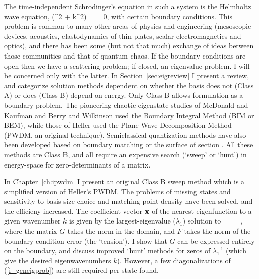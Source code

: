The time-independent Schrodinger's equation in such a system is
the Helmholtz wave equation,
\be
\label{eq:i_helm}
	(\nabla^2 + k^2) \psi\ofr \ = \ 0,
\ee
with certain boundary conditions.
This problem is common to many other areas of physics and engineering
(mesoscopic devices, acoustics, elastodynamics of thin plates,
scalar electromagnetics and optics),
and there
has been some (but not that much) exchange of ideas between those communities
and that of quantum chaos.
If the boundary conditions are open then we have a scattering problem;
if closed, an eigenvalue problem.
I will be concerned only with the latter.
In Section~\ref{sec:eigreview} I present a review, and
categorize solution methods dependent on whether the basis
does not (Class A) or does (Class B) depend on energy.
Only Class B allows formulation as a boundary problem.
The pioneering chaotic eigenstate studies of
McDonald and Kaufman \cite{macdonald}
and Berry and Wilkinson \cite{berrywilk} used the Boundary Integral Method
\cite{bim1,bim2}
(BIM or BEM), while those of Heller
\cite{Heller84,hellerleshouches} used the Plane Wave Decomposition Method (PWDM,
an original technique).
Semiclassical quantization methods have also been developed based
on boundary matching \cite{berrykkr} or the surface of section
\cite{bogomolny}.
All these methods are Class B, and all require an expensive search
(`sweep' or `hunt') in energy-space for zero-determinants of a matrix.

In Chapter~\ref{ch:ipwdm} I present an original
Class B sweep method which is a simplified
version of Heller's PWDM. The problems of missing states and sensitivity to
basis size choice and matching point density have been solved,
and the efficieny increased.
The coefficient vector ${\mathbf x}$ of the nearest eigenfunction to a given
wavenumber $k$ is given by the largest-eigenvalue ($\lambda_1$) solution to
\be
\label{i_geneigprob}
	  \ = \  ,
\ee
where the matrix $G$ takes the norm in the domain,
and $F$ takes the norm of the boundary condition error (the `tension').
I show that $G$ can be expressed entirely on the boundary, and discuss
improved `hunt' methods for zeros of $\lambda_1^{-1}$ (which give the desired
eigenwavenumbers $k$). However, a few diagonalizations of (\ref{i_geneigprob})
are still required per state found.

